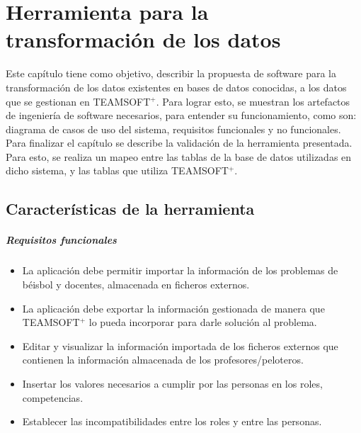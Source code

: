 \chapter{Herramienta para la transformación de los datos} \label{chap:3}

Este capítulo tiene como objetivo, describir la propuesta de software para la transformación de los datos existentes en bases de datos conocidas, a los datos que se gestionan en TEAMSOFT$^+$. Para lograr esto, se muestran los artefactos de ingeniería de software necesarios, para entender su funcionamiento, como son: diagrama de casos de uso del sistema, requisitos funcionales y no funcionales. Para finalizar el capítulo se describe la validación de la herramienta presentada. Para esto, se realiza un mapeo entre las tablas de la base de datos utilizadas en dicho sistema, y las tablas que utiliza TEAMSOFT$^+$.

\vspace{0.5cm}

\section{Características de la herramienta}


\paragraph{Requisitos funcionales}
\begin{itemize}
	\item La aplicación debe permitir importar la información de los problemas de béisbol y docentes, almacenada en ficheros externos.
	\item La aplicación debe exportar la información gestionada de manera que TEAMSOFT$^+$ lo pueda incorporar para darle solución al problema.
	\item Editar y visualizar la información importada de los ficheros externos que contienen la información almacenada de los profesores/peloteros.
	\item Insertar los valores necesarios a cumplir por las personas en los roles, competencias.
	\item Establecer las incompatibilidades entre los roles y entre las personas.
\end{itemize}


